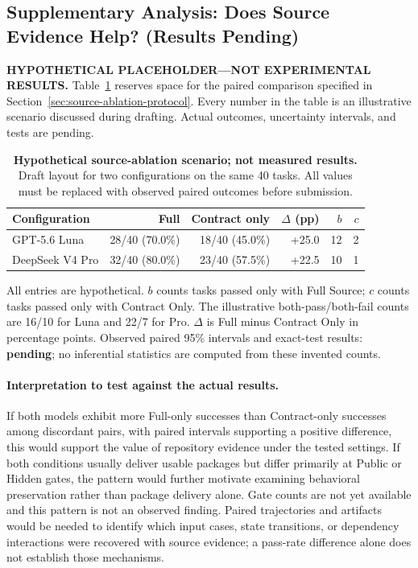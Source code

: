 \documentclass[acmsmall,screen,review,anonymous,nonacm]{acmart}
\begin{document}
\subsection{Supplementary Analysis: Does Source Evidence Help? (Results Pending)}
\label{sec:source-ablation-results}

\noindent\textbf{HYPOTHETICAL PLACEHOLDER---NOT EXPERIMENTAL RESULTS.}
Table~\ref{tab:source-ablation-placeholder} reserves space for the paired
comparison specified in Section~\ref{sec:source-ablation-protocol}.
Every number in the table is an illustrative scenario discussed during
drafting. Actual outcomes, uncertainty intervals, and tests are pending.

\begin{table}[tbp]
 \caption{\textbf{Hypothetical source-ablation scenario; not measured results.}
 Draft layout for two configurations on the same 40 tasks. All values must be
 replaced with observed paired outcomes before submission.}
 \label{tab:source-ablation-placeholder}
 \centering\small
 \setlength{\tabcolsep}{4pt}
 \begin{tabular}{@{}lrrrrr@{}}
 \toprule
 Configuration & Full & Contract only & $\Delta$ (pp) & $b$ & $c$ \\
 \midrule
 GPT-5.6 Luna & 28/40 (70.0\%) & 18/40 (45.0\%) & +25.0 & 12 & 2 \\
 DeepSeek V4 Pro & 32/40 (80.0\%) & 23/40 (57.5\%) & +22.5 & 10 & 1 \\
 \bottomrule
 \end{tabular}
 \par\smallskip\begin{minipage}{\linewidth}\footnotesize
 All entries are hypothetical. $b$ counts tasks passed only with Full Source;
 $c$ counts tasks passed only with Contract Only.
 The illustrative both-pass/both-fail counts are 16/10 for Luna and
 22/7 for Pro. $\Delta$ is Full minus Contract Only in percentage points.
 Observed paired 95\% intervals and exact-test results: \textbf{pending};
 no inferential statistics are computed from these invented counts.
 \end{minipage}
\end{table}

\paragraph{Interpretation to test against the actual results.}
If both models exhibit more Full-only successes than Contract-only successes
among discordant pairs, with
paired intervals supporting a positive difference, this would support the value
of repository evidence under the tested settings. If both conditions usually
deliver usable packages but differ primarily at Public or Hidden gates, the
pattern would further motivate examining behavioral preservation rather than
package delivery alone. Gate counts are not yet available and this pattern is
not an observed finding. Paired trajectories and artifacts would be needed to
identify which input cases, state transitions, or dependency interactions were
recovered with source evidence; a pass-rate difference alone does not establish
those mechanisms.
\end{document}
